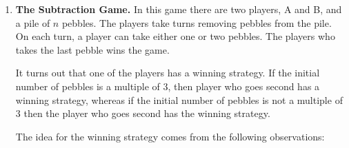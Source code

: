 \documentclass[]{book}
\makeatletter
\newenvironment{Shaded}{\begin{snugshade}}{\end{snugshade}}
\newcommand{\KeywordTok}[1]{\textcolor[rgb]{0.13,0.29,0.53}{\textbf{#1}}}
\newcommand{\DataTypeTok}[1]{\textcolor[rgb]{0.13,0.29,0.53}{#1}}
\newcommand{\DecValTok}[1]{\textcolor[rgb]{0.00,0.00,0.81}{#1}}
\newcommand{\NormalTok}[1]{#1}
\newenvironment{kframe}{%
\medskip{}
\setlength{\fboxsep}{.8em}
 \def\at@end@of@kframe{}%
 \ifinner\ifhmode%
  \def\at@end@of@kframe{\end{minipage}}%
  \begin{minipage}{\columnwidth}%
 \fi\fi%
 \def\FrameCommand##1{\hskip\@totalleftmargin \hskip-\fboxsep
 \colorbox{shadecolor}{##1}\hskip-\fboxsep
     \hskip-\linewidth \hskip-\@totalleftmargin \hskip\columnwidth}%
 \MakeFramed {\advance\hsize-\width
   \@totalleftmargin\z@ \linewidth\hsize
   \@setminipage}}%
 {\par\unskip\endMakeFramed%
 \at@end@of@kframe}
\renewenvironment{Shaded}{\begin{kframe}}{\end{kframe}}
\theoremstyle{definition}
\theoremstyle{definition}
\theoremstyle{definition}
\theoremstyle{remark}
\makeatother
\begin{document}
{\begin{enumerate}
\begin{verbatim}
## You need to enter a positive integer.  Try again!
\end{verbatim}

  Here is another example:

\begin{Shaded}
\begin{Highlighting}[]
\KeywordTok{madhavaGraph}\NormalTok{(}\DataTypeTok{n =} \DecValTok{20}\NormalTok{)}
\end{Highlighting}
\end{Shaded}

  The output should be as in Figure \ref{fig:madhavaGraph}.

  \begin{figure}

  {\centering \texttt{[image: r-notes\_files/figure-latex/madhavaGraph-1]} 

  }

  \caption{This is how the output of the     madhavaGraph function should look.}\label{fig:madhavaGraph}
  \end{figure}
\item
  \textbf{The Subtraction Game.} In this game there are two players, A
  and B, and a pile of \(n\) pebbles. The players take turns removing
  pebbles from the pile. On each turn, a player can take either one or
  two pebbles. The players who takes the last pebble wins the game.

  It turns out that one of the players has a winning strategy. If the
  initial number of pebbles is a multiple of 3, then player who goes
  second has a winning strategy, whereas if the initial number of
  pebbles is not a multiple of 3 then the player who goes second has the
  winning strategy.

  The idea for the winning strategy comes from the following
  observations:


\end{enumerate}}
\end{document}
